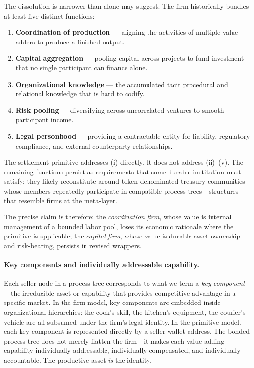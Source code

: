 \documentclass[11pt,a4paper]{article}
\theoremstyle{definition}
\theoremstyle{remark}
\begin{document}
The dissolution is narrower than  alone may
suggest. The firm historically bundles at least five distinct
functions:
\begin{enumerate}[label=(\roman*)]
  \item \textbf{Coordination of production} --- aligning the activities
    of multiple value-adders to produce a finished output.
  \item \textbf{Capital aggregation} --- pooling capital across
    projects to fund investment that no single participant can
    finance alone.
  \item \textbf{Organizational knowledge} --- the accumulated tacit
    procedural and relational knowledge that is hard to codify.
  \item \textbf{Risk pooling} --- diversifying across uncorrelated
    ventures to smooth participant income.
  \item \textbf{Legal personhood} --- providing a contractable entity
    for liability, regulatory compliance, and external counterparty
    relationships.
\end{enumerate}

The settlement primitive addresses (i) directly. It does not
address (ii)--(v). The remaining functions persist as requirements
that some durable institution must satisfy; they likely reconstitute
around token-denominated treasury communities whose members
repeatedly participate in compatible process trees---structures that
resemble firms at the meta-layer.

The precise claim is therefore: the \emph{coordination firm}, whose
value is internal management of a bounded labor pool, loses its
economic rationale where the primitive is applicable; the
\emph{capital firm}, whose value is durable asset ownership and
risk-bearing, persists in revised wrappers.

\paragraph{Key components and individually addressable capability.}
Each seller node in a process tree corresponds to what we term a
\emph{key component}---the irreducible asset or capability that
provides competitive advantage in a specific market. In the firm
model, key components are embedded inside organizational hierarchies:
the cook's skill, the kitchen's equipment, the courier's vehicle are
all subsumed under the firm's legal identity. In the primitive
model, each key component is represented directly by a seller wallet
address. The bonded process tree does not merely flatten the firm---it
makes each value-adding capability individually addressable,
individually compensated, and individually accountable. The
productive asset \emph{is} the identity.
\end{document}
